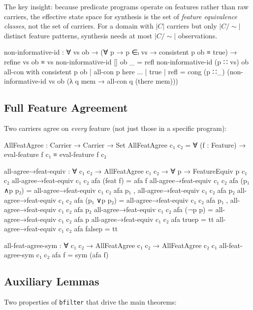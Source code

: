 \documentclass[9pt,a4paper]{article}
\theoremstyle{plain}
\theoremstyle{definition}
\theoremstyle{remark}
\begin{document}
The key insight: because predicate programs operate on features rather than raw carriers, the effective state space for synthesis is the set of \emph{feature equivalence classes}, not the set of carriers.  For a domain with $|C|$ carriers but only $|C/{\sim}|$ distinct feature patterns, synthesis needs at most $|C/{\sim}|$ observations.

\begin{code}
    non-informative-id : ∀ vs ob →
      (∀ p → p ∈ₗ vs → consistent p ob ≡ true) →
      refine vs ob ≡ vs
    non-informative-id [] ob _ = refl
    non-informative-id (p ∷ vs) ob all-con with consistent p ob
      | all-con p here
    ... | true | refl =
      cong (p ∷_) (non-informative-id vs ob
        (λ q mem → all-con q (there mem)))
\end{code}

\subsection{Full Feature Agreement}

Two carriers agree on \emph{every} feature (not just those in a specific program):

\begin{code}
    AllFeatAgree : Carrier → Carrier → Set
    AllFeatAgree c₁ c₂ = ∀ (f : Feature) →
      eval-feature f c₁ ≡ eval-feature f c₂

    all-agree→feat-equiv : ∀ c₁ c₂ →
      AllFeatAgree c₁ c₂ →
      ∀ p → FeatureEquiv p c₁ c₂
    all-agree→feat-equiv c₁ c₂ afa (feat f)    = afa f
    all-agree→feat-equiv c₁ c₂ afa (p₁ ∧p p₂) =
      all-agree→feat-equiv c₁ c₂ afa p₁ ,
      all-agree→feat-equiv c₁ c₂ afa p₂
    all-agree→feat-equiv c₁ c₂ afa (p₁ ∨p p₂) =
      all-agree→feat-equiv c₁ c₂ afa p₁ ,
      all-agree→feat-equiv c₁ c₂ afa p₂
    all-agree→feat-equiv c₁ c₂ afa (¬p p)      =
      all-agree→feat-equiv c₁ c₂ afa p
    all-agree→feat-equiv c₁ c₂ afa truep        = tt
    all-agree→feat-equiv c₁ c₂ afa falsep       = tt

    all-feat-agree-sym : ∀ c₁ c₂ →
      AllFeatAgree c₁ c₂ → AllFeatAgree c₂ c₁
    all-feat-agree-sym c₁ c₂ afa f = sym (afa f)
\end{code}

\subsection{Auxiliary Lemmas}

Two properties of \texttt{bfilter} that drive the main theorems:
\end{document}
